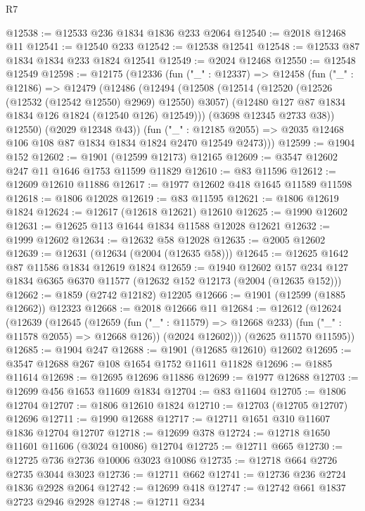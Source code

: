 \begin{lexlean}{R7}
\begin{coremodule}
@12538 := @12533 @236 @1834 @1836 @233 @2064
@12540 := @2018 @12468 @11
@12541 := @12540 @233
@12542 := @12538 @12541
@12548 := @12533 @87 @1834 @1834 @233 @1824 @12541
@12549 := @2024 @12468
@12550 := @12548 @12549
@12598 := @12175
    (@12336
      (fun ("_" : @12337) =>
      @12458
        (fun ("_" : @12186) =>
        @12479
          (@12486
            (@12494
              (@12508
                (@12514
                  (@12520 (@12526 (@12532 (@12542 @12550) @2969) @12550) @3057)
                  (@12480 @127 @87 @1834 @1834 @126 @1824 (@12540 @126) @12549)))
              (@3698 @12345 @2733 @38))
            @12550)
          (@2029 @12348 @43))
        (fun ("_" : @12185 @2055) =>
        @2035 @12468 @106 @108 @87 @1834 @1834 @1824 @2470 @12549 @2473)))
@12599 := @1904 @152
@12602 := @1901 (@12599 @12173) @12165
@12609 := @3547 @12602 @247 @11 @1646 @1753 @11599 @11829
@12610 := @83 @11596
@12612 := @12609 @12610 @11886
@12617 := @1977 @12602 @418 @1645 @11589 @11598
@12618 := @1806 @12028
@12619 := @83 @11595
@12621 := @1806 @12619 @1824
@12624 := @12617 (@12618 @12621) @12610
@12625 := @1990 @12602
@12631 := @12625 @113 @1644 @1834 @11588 @12028 @12621
@12632 := @1999 @12602
@12634 := @12632 @58 @12028
@12635 := @2005 @12602
@12639 := @12631 (@12634 (@2004 (@12635 @58)))
@12645 := @12625 @1642 @87 @11586 @1834 @12619 @1824
@12659 := @1940
    @12602
    @157
    @234
    @127
    @1834
    @6365
    @6370
    @11577
    (@12632 @152 @12173 (@2004 (@12635 @152)))
@12662 := @1859 (@2742 @12182) @12205
@12666 := @1901 (@12599 (@1885 @12662)) @12323
@12668 := @2018 @12666 @11
@12684 := @12612
    (@12624
      (@12639
        (@12645
          (@12659 (fun ("_" : @11579) => @12668 @233) (fun ("_" : @11578 @2055) => @12668 @126))
          (@2024 @12602)))
      (@2625 @11570 @11595))
@12685 := @1904 @247
@12688 := @1901 (@12685 @12610) @12602
@12695 := @3547 @12688 @267 @108 @1654 @1752 @11611 @11828
@12696 := @1885 @11614
@12698 := @12695 @12696 @11886
@12699 := @1977 @12688
@12703 := @12699 @456 @1653 @11609 @1834
@12704 := @83 @11604
@12705 := @1806 @12704
@12707 := @1806 @12610 @1824
@12710 := @12703 (@12705 @12707) @12696
@12711 := @1990 @12688
@12717 := @12711 @1651 @310 @11607 @1836 @12704 @12707
@12718 := @12699 @378
@12724 := @12718 @1650 @11601 @11606 (@3024 @10086) @12704
@12725 := @12711 @665
@12730 := @12725 @736 @2736 @10006 @3023 @10086
@12735 := @12718 @664 @2726 @2735 @3044 @3023
@12736 := @12711 @662
@12741 := @12736 @236 @2724 @1836 @2928 @2064
@12742 := @12699 @418
@12747 := @12742 @661 @1837 @2723 @2946 @2928
@12748 := @12711 @234

\end{coremodule}
\end{lexlean}
